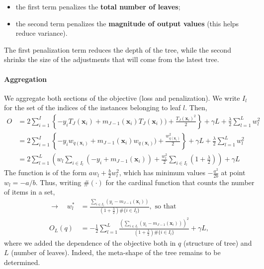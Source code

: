 \begin{itemize}
\item the first term penalizes the \textbf{total number of leaves};
\item the second term penalizes the \textbf{magnitude of output values} (this helps reduce variance).
\end{itemize}

The first penalization term reduces the depth of the tree, while the second shrinks the size of the adjustments that will come from the latest tree.

\paragraph{Aggregation}

We aggregate both sections of the objective (loss and penalization). We write $I_l$ for the set of the indices of the instances belonging to leaf $l$. Then,\newline
\begin{equation}
\begin{aligned}
O&= 2\sum_{i=1}^I\left\{ -y_iT_J(\mathbf{x}_i)+m_{J-1}(\mathbf{x}_i) T_J(\mathbf{x}_i))+\frac{T_J(\mathbf{x}_i)^2}{2} \right\} + \gamma L+\frac{\lambda}{2}\sum_{l=1}^Lw_l^2 \\
&=2\sum_{i=1}^I\left\{- y_iw_{q(\mathbf{x}_i)}+m_{J-1}(\mathbf{x}_i)w_{q(\mathbf{x}_i)})+\frac{w_{q(\mathbf{x}_i)}^2}{2} \right\} + \gamma L+\frac{\lambda}{2}\sum_{l=1}^Lw_l^2 \\
&=2 \sum_{l=1}^L \left(w_l\sum_{i\in I_l}(-y_i +m_{J-1}(\mathbf{x}_i))+ \frac{w_l^2}{2}\sum_{i\in I_l}\left(1+\frac{\lambda}{2}\right)\right)+ \gamma L
\end{aligned}
\end{equation}
The function is of the form $aw_l+\frac{b}{2}w_l^2$, which has minimum values $-\frac{a^2}{2b}$ at point $w_l= -a/b$. Thus, writing $\#(\cdot)$ for the cardinal function that counts the number of items in a set,
\begin{equation}
\begin{aligned}
\mathbf{\rightarrow} \quad w^*_l&=\frac{\sum_{i\in I_l}(y_i -m_{J-1}(\mathbf{x}_i))}{\left(1+\frac{\lambda}{2}\right)\#\{i\in I_l\}}, \text{ so that} \\
O_L(q)&=-\frac{1}{2}\sum_{l=1}^L \frac{\left(\sum_{i\in I_l}(y_i -m_{J-1}(\mathbf{x}_i))\right)^2}{\left(1+\frac{\lambda}{2}\right)\#\{i\in I_l\}}+\gamma L, \nonumber
\end{aligned}
\end{equation}
where we added the dependence of the objective both in $q$ (structure of tree) and $L$ (number of leaves). Indeed, the meta-shape of the tree remains to be determined.

